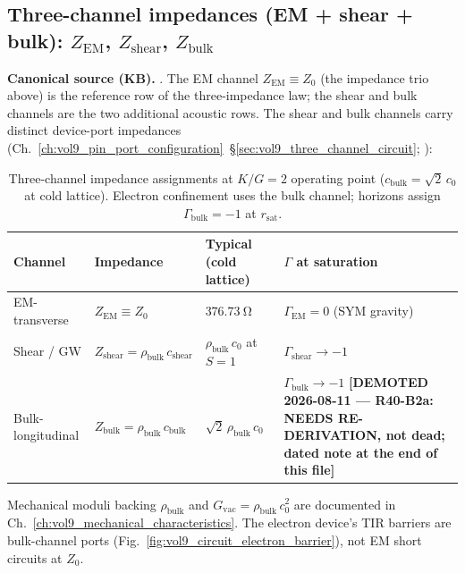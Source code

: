 \subsection{Three-channel impedances (EM + shear + bulk): $Z_{\mathrm{EM}}$, $Z_{\mathrm{shear}}$, $Z_{\mathrm{bulk}}$}
\label{subsec:vol9_dc_three_channel_impedances}

\noindent\textbf{Canonical source (KB).} . The EM channel $Z_{\mathrm{EM}} \equiv Z_0$ (the impedance trio above) is the reference row of the three-impedance law; the shear and bulk channels are the two additional acoustic rows. The shear and bulk channels carry distinct device-port impedances (Ch.~\ref{ch:vol9_pin_port_configuration}~\S\ref{sec:vol9_three_channel_circuit}; ):

\begin{table}[htbp]
\centering\footnotesize
\begin{tabularx}{\textwidth}{@{}l l l X@{}}
\toprule
\textbf{Channel} & \textbf{Impedance} & \textbf{Typical (cold lattice)} & \textbf{$\Gamma$ at saturation} \\
\midrule
EM-transverse & $Z_{\mathrm{EM}} \equiv Z_0$ & $\qty{376.73}{\ohm}$ & $\Gamma_{\mathrm{EM}} = 0$ (SYM gravity) \\
Shear / GW & $Z_{\mathrm{shear}} = \rho_{\mathrm{bulk}}\,c_{\mathrm{shear}}$ & $\rho_{\mathrm{bulk}}\,c_0$ at $S=1$ & $\Gamma_{\mathrm{shear}} \to -1$ \\
Bulk-longitudinal & $Z_{\mathrm{bulk}} = \rho_{\mathrm{bulk}}\,c_{\mathrm{bulk}}$ & $\sqrt{2}\,\rho_{\mathrm{bulk}}\,c_0$ & $\Gamma_{\mathrm{bulk}} \to -1$ \textbf{[DEMOTED 2026-08-11 --- R40-B2a: NEEDS RE-DERIVATION, not dead; dated note at the end of this file]} \\
\bottomrule
\end{tabularx}
\caption{Three-channel impedance assignments at $K/G = 2$ operating point ($c_{\mathrm{bulk}} = \sqrt{2}\,c_0$ at cold lattice). Electron confinement uses the bulk channel; horizons assign $\Gamma_{\mathrm{bulk}} = -1$ at $r_{\mathrm{sat}}$.}
\label{tab:vol9_dc_three_channel}
\end{table}

\noindent
Mechanical moduli backing $\rho_{\mathrm{bulk}}$ and $G_{\mathrm{vac}} = \rho_{\mathrm{bulk}}\,c_0^2$ are documented in Ch.~\ref{ch:vol9_mechanical_characteristics}. The electron device's TIR barriers are bulk-channel ports (Fig.~\ref{fig:vol9_circuit_electron_barrier}), not EM short circuits at $Z_0$.

